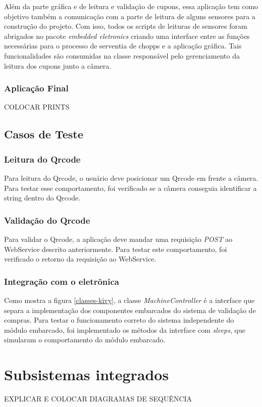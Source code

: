 Além da parte gráfica e de leitura e validação de cupons, essa aplicação tem como objetivo
também a comunicação com a parte de leitura de alguns sensores para a construção do projeto.
Com isso, todos os scripts de leituras de sensores foram abrigados no pacote
\textit{embedded eletronics} criando uma interface entre as funções necessárias para o processo
de serventia de chopps e a aplicação gráfica. Tais funcionalidades são consumidas na classe
responsável pelo gerenciamento da leitura dos cupons junto a câmera.

\subsubsection{Aplicação Final}

COLOCAR PRINTS

\subsection{Casos de Teste}

\subsubsection{Leitura do Qrcode}

Para leitura do Qrcode, o usuário deve posicionar um Qrcode em frente a câmera.
Para testar esse comportamento, foi verificado se a câmera conseguia identificar a string dentro do Qrcode.

\subsubsection{Validação do Qrcode}

Para validar o Qrcode, a aplicação deve mandar uma requisição \textit{POST} ao WebService descrito anteriormente.
Para testar este comportamento, foi verificado o retorno da requisição ao WebService.

\subsubsection{Integração com o eletrônica}

Como mostra a figura \ref{classes-kivy}, a classe \textit{MachineController} é a interface que separa
a implementação dos componentes embarcados do sistema de validação de compras. Para testar o funcionamento
correto do sistema independente do módulo embarcado, foi implementado os métodos da interface com
\textit{sleeps}, que simularam o comportamento do módulo embarcado.

\section{Subsistemas integrados}

EXPLICAR E COLOCAR DIAGRAMAS DE SEQUÊNCIA